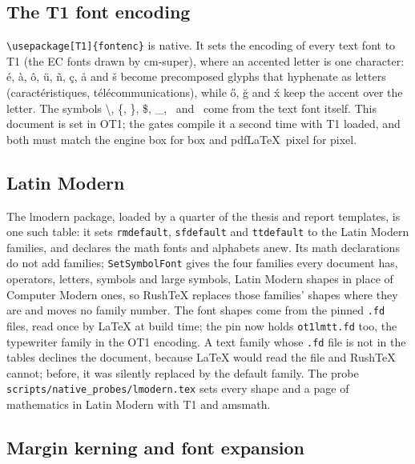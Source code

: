 \documentclass{article}
\numberwithin{equation}{section}
\theoremstyle{definition}
\theoremstyle{remark}
\begin{document}
\subsection{The T1 font encoding}
\texttt{\textbackslash usepackage[T1]\{fontenc\}} is native. It sets the encoding of every
text font to T1 (the EC fonts drawn by cm-super), where an accented letter is one
character: \'e, \`a, \^o, \"u, \~n, \c{c}, \r{a} and \v{s} become precomposed glyphs that
hyphenate as letters (caract\'eristiques, t\'el\'ecommunications), while \H{o}, \u{g} and
\'x keep the accent over the letter. The symbols \textbackslash, \{, \}, \$, \_,
\textbar\ and \textsection\ come from the text font itself.
This document is set in OT1; the gates compile it a second time with T1 loaded, and both
must match the engine box for box and pdf\LaTeX\ pixel for pixel.

\subsection{Latin Modern}\label{sec:lmodern}

The lmodern package, loaded by a quarter of the thesis and report templates, is one such
table: it sets \texttt{rmdefault}, \texttt{sfdefault} and \texttt{ttdefault} to the Latin
Modern families, and declares the math fonts and alphabets anew. Its math declarations do
not add families; \texttt{SetSymbolFont} gives the four families every document has,
operators, letters, symbols and large symbols, Latin Modern shapes in place of Computer
Modern ones, so RushTeX replaces those families' shapes where they are and moves no
family number. The font shapes come from the pinned \texttt{.fd} files, read once by
LaTeX at build time; the pin now holds \texttt{ot1lmtt.fd} too, the typewriter family in
the OT1 encoding. A text family whose \texttt{.fd} file is not in the tables declines the
document, because LaTeX would read the file and RushTeX cannot; before, it was silently
replaced by the default family. The probe \texttt{scripts/native\_probes/lmodern.tex}
sets every shape and a page of mathematics in Latin Modern with T1 and amsmath.

\subsection{Margin kerning and font expansion}\label{sec:microtype}
\end{document}
